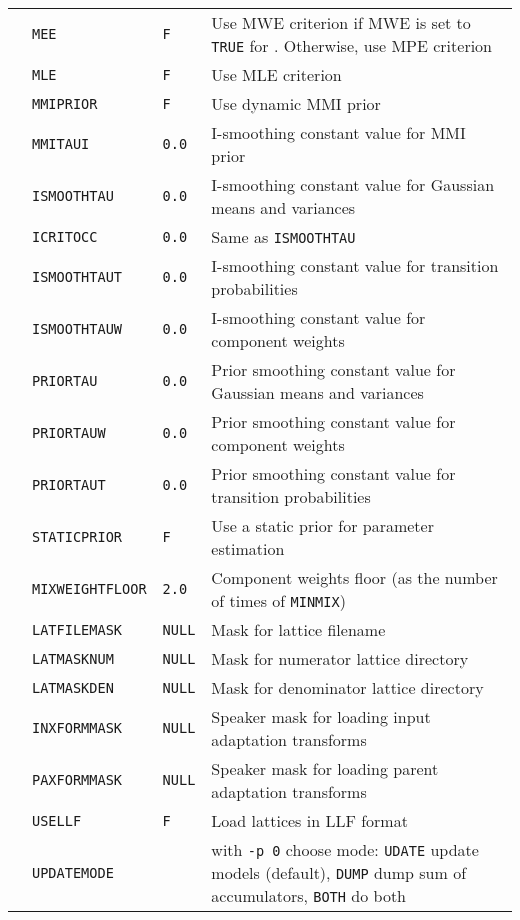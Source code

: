 \begin{center}
\begin{supertabular}{|p{1.8cm}|l|l|p{6.6cm}|}
& \texttt{MEE} & \texttt{F} & Use MWE criterion if MWE is set to \texttt{TRUE} for . Otherwise, use MPE criterion \\ 
& \texttt{MLE} & \texttt{F} & Use MLE criterion \\ 
& \texttt{MMIPRIOR} & \texttt{F} & Use dynamic MMI prior \\ 
& \texttt{MMITAUI} & \texttt{0.0} & I-smoothing constant value for MMI prior \\ 
& \texttt{ISMOOTHTAU} & \texttt{0.0} & I-smoothing constant value for Gaussian means and variances \\ 
& \texttt{ICRITOCC} & \texttt{0.0} & Same as \texttt{ISMOOTHTAU} \\ 
& \texttt{ISMOOTHTAUT} & \texttt{0.0} & I-smoothing constant value for transition probabilities \\ 
& \texttt{ISMOOTHTAUW} & \texttt{0.0} & I-smoothing constant value for component weights \\ 
& \texttt{PRIORTAU} & \texttt{0.0} & Prior smoothing constant value for Gaussian means and variances \\ 
& \texttt{PRIORTAUW} & \texttt{0.0} & Prior smoothing constant value for component weights \\ 
& \texttt{PRIORTAUT} & \texttt{0.0} & Prior smoothing constant value for transition probabilities \\ 
& \texttt{STATICPRIOR} & \texttt{F} & Use a static prior for parameter estimation \\ 
& \texttt{MIXWEIGHTFLOOR} & \texttt{2.0} & Component weights floor (as the number of times of \texttt{MINMIX}) \\ 
& \texttt{LATFILEMASK} & \texttt{NULL} & Mask for lattice filename \\ 
& \texttt{LATMASKNUM} & \texttt{NULL} & Mask for numerator lattice directory \\ 
& \texttt{LATMASKDEN} & \texttt{NULL} & Mask for denominator lattice directory \\ 
& \texttt{INXFORMMASK} & \texttt{NULL} & Speaker mask for loading input adaptation transforms \\ 
& \texttt{PAXFORMMASK} & \texttt{NULL} & Speaker mask for loading parent adaptation transforms \\ 
& \texttt{USELLF} & \texttt{F} & Load lattices in LLF format \\ 
  & \texttt{UPDATEMODE} & & with \texttt{-p 0} choose mode:
  \texttt{UDATE} update models (default), \texttt{DUMP} dump sum of
  accumulators, \texttt{BOTH} do both\\  \hline


\end{supertabular}
\end{center}
